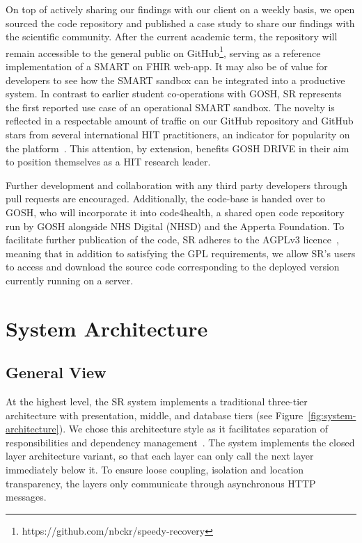 \documentclass[sigconf]{acmart}
\begin{document}
On top of actively sharing our findings with our client on a weekly basis, we open sourced the code repository and published a case study to share our findings with the scientific community. After the current academic term, the repository will remain accessible to the general public on GitHub\footnote{https://github.com/nbckr/speedy-recovery}, serving as a reference implementation of a SMART on FHIR web-app. It may also be of value for developers to see how the SMART sandbox can be integrated into a productive system. In contrast to earlier student co-operations with GOSH, SR represents the first reported use case of an operational SMART sandbox. The novelty is reflected in a respectable amount of traffic on our GitHub repository and GitHub stars from several international HIT practitioners, an indicator for popularity on the platform~\cite{DBLP:github-popularity}. This attention, by extension, benefits GOSH DRIVE in their aim to position themselves as a HIT research leader.

Further development and collaboration with any third party developers through pull requests are encouraged. Additionally, the code-base is handed over to GOSH, who will incorporate it into code4health, a shared open code repository run by GOSH alongside NHS Digital (NHSD) and the Apperta Foundation. To facilitate further publication of the code, SR adheres to the AGPLv3 licence~\cite{agplv3}, meaning that in addition to satisfying the GPL requirements, we allow SR's users to access and download the source code corresponding to the deployed version currently running on a server.


\section{System Architecture}
\label{sec:architecture}


\subsection{General View}

At the highest level, the SR system implements a traditional three-tier architecture with presentation, middle, and database tiers (see Figure~\ref{fig:system-architecture}). We chose this architecture style as it facilitates separation of responsibilities and dependency management~\cite{ms-ntier}. The system implements the closed layer architecture variant, so that each layer can only call the next layer immediately below it. To ensure loose coupling, isolation and location transparency, the layers only communicate through asynchronous HTTP messages.
\end{document}
